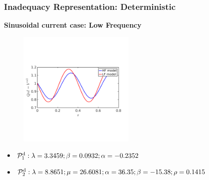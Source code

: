 \documentclass[10pt,xcolor=dvipsnames,compress]{beamer}
\begin{document}
\begin{frame}
\frametitle{Inadequacy Representation: Deterministic}
\textbf{Sinusoidal current case: Low Frequency}

\vfill

\begin{figure}
\includegraphics[trim = 0.in  2.3in 0.in 2.8in.in, clip, width=0.5\textwidth]{figs/Isin_low_V_hf_lf.png}
\end{figure}

\vspace{-0.1in}


\begin{itemize}

\item $\mathcal{P}_1^{\rm d}:   \lambda = 3.3459; \beta = 0.0932; \alpha = -0.2352$

\item $\mathcal{P}_2^{\rm d}:   \lambda = 8.8651; \mu = 26.6081; \alpha = 36.35; \beta = -15.38; \rho = 0.1415$

\end{itemize}

\vspace{-0.1in}


\end{frame}
\end{document}
